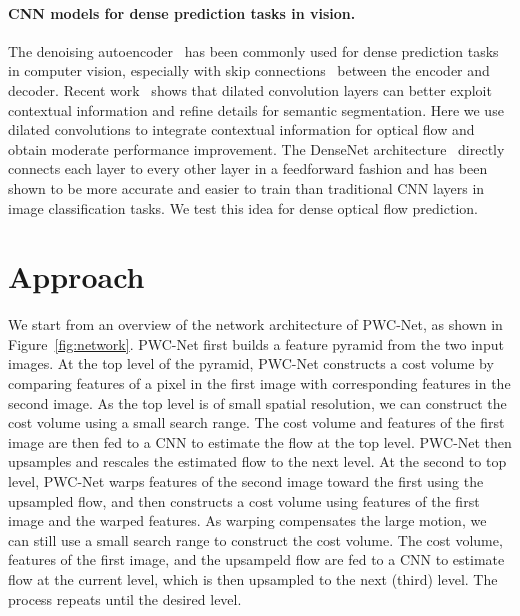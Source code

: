 \documentclass[10pt,journal,cspaper,compsoc]{IEEEtran}
\newcommand{\beforePara}{\vspace{-0em}}
\begin{document}
	\beforePara
	\paragraph{CNN models for dense prediction tasks in  vision.}
	The denoising autoencoder~\cite{vincent2008extracting} has been commonly used for dense prediction tasks in computer vision, especially with skip connections~\cite{ronneberger2015u} between the encoder and decoder. Recent work~\cite{chen2017deeplab,yu2015multi} shows that dilated convolution layers can better exploit contextual information and refine details for semantic segmentation. Here we use dilated convolutions to integrate contextual information for optical flow and obtain moderate performance improvement. The DenseNet architecture~\cite{huang2016densely,Jegou:2016:Densenet} directly connects each layer to every other layer in a feedforward fashion and has been shown to be more accurate and easier to train than traditional CNN layers in image classification tasks. We test this idea for dense optical flow prediction. 
	

	
	\section{Approach}
	
	We start from an overview of the network architecture of PWC-Net, as shown in Figure~\ref{fig:network}. PWC-Net first builds a feature pyramid from the two input images. At the top level of the pyramid, PWC-Net constructs a cost volume by comparing features of a pixel in the first image with corresponding features in the second image. As the top level is of small spatial resolution, we can construct the cost volume using a small search range. The cost volume and features of the first image are then fed to a CNN to estimate the flow at the top level. PWC-Net then upsamples and rescales the estimated flow to the next level. At the second to top level, PWC-Net warps features of the second image toward the first using the upsampled flow, and then constructs a cost volume using features of the first image and the warped features. As warping compensates the large motion, we can still use a small search range to construct the cost volume. The cost volume, features of the first image, and the upsampeld flow are fed to a CNN to estimate flow at the current level, which is then upsampled to the next (third) level. The process repeats until the desired level. 
	
\end{document}
